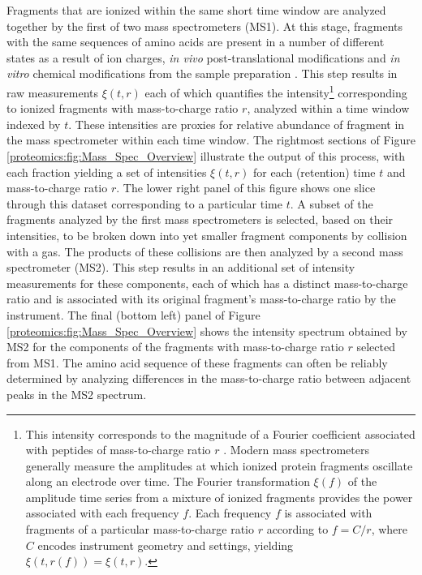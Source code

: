 Fragments that are ionized within the same short time window are analyzed together by the first of two mass spectrometers (MS1).
At this stage, fragments with the same sequences of amino acids are present in a number of different states as a result of ion charges, \emph{in vivo} post-translational modifications and \emph{in vitro} chemical modifications from the sample preparation \citep{Michalski:2011gm}.
This step results in raw measurements $\xi(t, r)$ each of which quantifies the intensity\footnote{This intensity corresponds to the magnitude of a Fourier coefficient associated with peptides of mass-to-charge ratio $r$ \citep{Scigelova:2006p10560}. Modern mass spectrometers generally measure the amplitudes at which ionized protein fragments oscillate along an electrode over time. The Fourier transformation $\xi(f)$ of the amplitude time series from a mixture of ionized fragments provides the power associated with each frequency $f$. Each frequency $f$ is associated with fragments of a particular mass-to-charge ratio $r$ according to $f=C/r$, where $C$ encodes instrument geometry and settings, yielding $\xi(t, r(f)) = \xi(t, r)$.
}
%
corresponding to ionized fragments with mass-to-charge ratio $r$, analyzed within a time window indexed by $t$.
These intensities are proxies for relative abundance of fragment in the mass spectrometer within each time window.
%
The rightmost sections of Figure \ref{proteomics:fig:Mass_Spec_Overview} illustrate the output of this process, with each fraction yielding a set of intensities $\xi(t, r)$ for each (retention) time $t$ and mass-to-charge ratio $r$.
The lower right panel of this figure shows one slice through this dataset corresponding to a particular time $t$.
%
A subset of the fragments analyzed by the first mass spectrometers is selected, based on their intensities, to be broken down into yet smaller fragment components by collision with a gas.
The products of these collisions are then analyzed by a second mass spectrometer (MS2).
This step results in an additional set of intensity measurements for these components, each of which has a distinct mass-to-charge ratio and is associated with its original fragment's mass-to-charge ratio by the instrument.
The final (bottom left) panel of Figure \ref{proteomics:fig:Mass_Spec_Overview} shows the intensity spectrum obtained by MS2 for the components of the fragments with mass-to-charge ratio $r$ selected from MS1.
The amino acid sequence of these fragments can often be reliably determined by analyzing differences in the mass-to-charge ratio between adjacent peaks in the MS2 spectrum.

